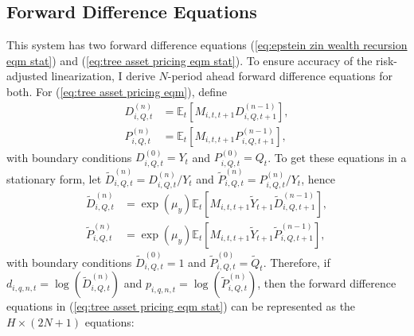 \documentclass[12 pt, oneside]{article}
\theoremstyle{definition}
\theoremstyle{definition}
\theoremstyle{definition}
\newcommand{\E}{\mathbb{E}}
\begin{document}
\subsection{Forward Difference Equations}

This system has two forward difference equations (\ref{eq:epstein zin wealth recursion eqm stat}) and (\ref{eq:tree asset pricing eqm stat}). To ensure accuracy of the risk-adjusted linearization, I derive $N$-period ahead forward difference equations for both.
For (\ref{eq:tree asset pricing eqm}), define
\begin{align}
  D_{i, Q, t}^{(n)} & = \E_t[M_{i, t, t + 1} D_{i, Q, t + 1}^{(n - 1)}],\\
  P_{i, Q, t}^{(n)} & = \E_t[M_{i, t, t + 1} P_{i, Q, t + 1}^{(n - 1)}],
\end{align}
with boundary conditions $D_{i, Q, t}^{(0)} = Y_t$ and $P_{i, Q, t}^{(0)} = Q_t$. To get these equations in a stationary form, let $\tilde{D}_{i, Q, t}^{(n)} = D_{i, Q, t}^{(n)} / Y_t$ and $\tilde{P}_{i, Q, t}^{(n)} = P_{i, Q, t}^{(n)} / Y_t$, hence
\begin{align}
  \tilde{D}_{i, Q, t}^{(n)} & = \exp(\mu_y)\E_t[M_{i, t, t + 1} \tilde{Y}_{t + 1}\tilde{D}_{i, Q, t + 1}^{(n - 1)}],\\
  \tilde{P}_{i, Q, t}^{(n)} & = \exp(\mu_y)\E_t[M_{i, t, t + 1} \tilde{Y}_{t + 1}\tilde{P}_{i, Q, t + 1}^{(n - 1)}],
\end{align}
with boundary conditions $\tilde{D}_{i, Q, t}^{(0)} = 1$ and $\tilde{P}_{i, Q, t}^{(0)} = \tilde{Q}_t$.
Therefore, if $d_{i, q, n, t} = \log(\tilde{D}_{i, Q, t}^{(n)})$ and $p_{i, q, n, t} = \log(\tilde{P}_{i, Q, t}^{(n)})$, then the forward difference equations in (\ref{eq:tree asset pricing eqm stat}) can be represented as the $H \times (2N + 1)$ equations:
\end{document}
